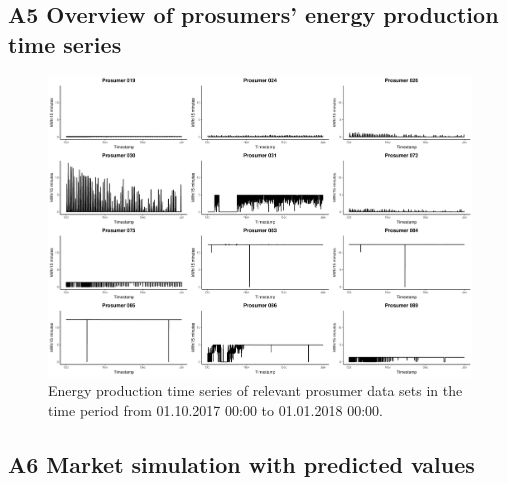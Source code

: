 \subsection*{\hypertarget{AppA5:Figures:producer_all}{A5} Overview of prosumers' energy production time series}\label{AppA5:Figures:producer_all}

\begin{figure}[H]
    \centering
    \includegraphics[width=\textwidth]{thesis/graphs/marketsimulation/producers_all.pdf}
    \caption[Energy production time series of relevant prosumer data sets]{Energy production time series of relevant prosumer data sets in the time period from 01.10.2017 00:00 to 01.01.2018 00:00. \quantnet\href{ }{}}
\end{figure}


\newpage
\subsection*{\hypertarget{AppA6:Figures:marketsimulation_pred}{A6} Market simulation with predicted values}\label{AppA6:Figures:marketsimulation_pred}

